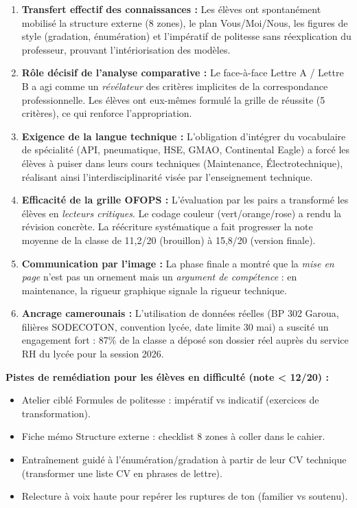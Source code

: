 \documentclass[11pt]{article}
\begin{document}
\begin{enumerate}
    \item \textbf{Transfert effectif des connaissances :} Les élèves ont spontanément mobilisé la structure externe (8 zones), le plan Vous/Moi/Nous, les figures de style (gradation, énumération) et l'impératif de politesse sans réexplication du professeur, prouvant l'intériorisation des modèles.
    \item \textbf{Rôle décisif de l'analyse comparative :} Le face-à-face Lettre A / Lettre B a agi comme un \emph{révélateur} des critères implicites de la correspondance professionnelle. Les élèves ont eux-mêmes formulé la grille de réussite (5 critères), ce qui renforce l'appropriation.
    \item \textbf{Exigence de la langue technique :} L'obligation d'intégrer du vocabulaire de spécialité (API, pneumatique, HSE, GMAO, Continental Eagle) a forcé les élèves à puiser dans leurs cours techniques (Maintenance, Électrotechnique), réalisant ainsi l'interdisciplinarité visée par l'enseignement technique.
    \item \textbf{Efficacité de la grille OFOPS :} L'évaluation par les pairs a transformé les élèves en \emph{lecteurs critiques}. Le codage couleur (vert/orange/rose) a rendu la révision concrète. La réécriture systématique a fait progresser la note moyenne de la classe de 11,2/20 (brouillon) à 15,8/20 (version finale).
    \item \textbf{Communication par l'image :} La phase finale a montré que la \emph{mise en page} n'est pas un ornement mais un \emph{argument de compétence} : en maintenance, la rigueur graphique signale la rigueur technique.
    \item \textbf{Ancrage camerounais :} L'utilisation de données réelles (BP 302 Garoua, filières SODECOTON, convention lycée, date limite 30 mai) a suscité un engagement fort : 87\% de la classe a déposé son dossier réel auprès du service RH du lycée pour la session 2026.
\end{enumerate}

\par
\textbf{Pistes de remédiation pour les élèves en difficulté (note < 12/20) :}
\begin{itemize}
    \item Atelier ciblé \og{}Formules de politesse : impératif vs indicatif\fg{} (exercices de transformation).
    \item Fiche mémo \og{}Structure externe : checklist 8 zones\fg{} à coller dans le cahier.
    \item Entraînement guidé à l'énumération/gradation à partir de leur CV technique (transformer une liste CV en phrases de lettre).
    \item Relecture à voix haute pour repérer les ruptures de ton (familier vs soutenu).
\end{itemize}
\end{document}

